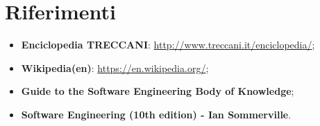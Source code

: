 \section{Riferimenti}

\begin{itemize}
\item \textbf{Enciclopedia TRECCANI}: \url{http://www.treccani.it/enciclopedia/};
\item \textbf{Wikipedia(en)}: \url{https://en.wikipedia.org/};
\item \textbf{Guide to the Software Engineering Body of Knowledge};
\item \textbf{Software Engineering (10th edition) - Ian Sommerville}.
\end{itemize}

\clearpage